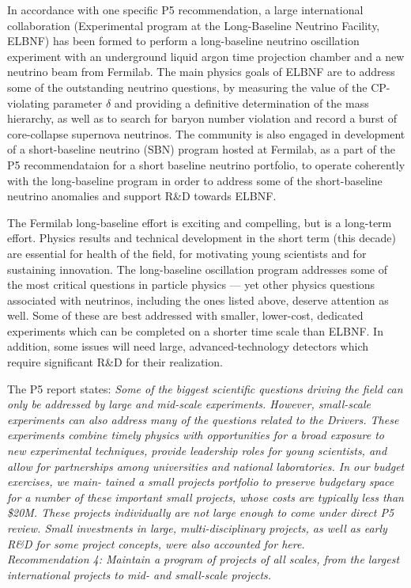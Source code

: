 In accordance with one specific P5 recommendation, a large international
collaboration (Experimental program at the Long-Baseline Neutrino
Facility, ELBNF) has been formed to perform a long-baseline neutrino
oscillation experiment with an underground liquid argon time
projection chamber and a new neutrino beam from
Fermilab. The main physics goals of ELBNF are to address some of the
outstanding neutrino questions, by measuring the value of
the CP-violating parameter $\delta$ and providing a definitive
determination of the mass hierarchy, as well as to search for baryon
number violation and record a burst of core-collapse supernova
neutrinos. The community is also engaged in development of a short-baseline
neutrino (SBN) program hosted at Fermilab, as a part of the P5
recommendataion for a short baseline neutrino portfolio, to operate
coherently with the long-baseline program in order to address some of
the short-baseline neutrino anomalies and support R\&D towards ELBNF.

The Fermilab long-baseline effort is exciting and compelling, but
is a long-term effort.  Physics results and technical development in
the short term (this decade) are essential for health of the field,
for motivating young scientists and for sustaining innovation.  The
long-baseline oscillation program addresses some of the most critical
questions in particle physics --- yet other physics questions
associated with neutrinos, including the ones listed above, deserve
attention as well.  Some of these are best addressed with smaller,
lower-cost, dedicated experiments which can be completed
on a shorter time scale than ELBNF.  In addition, some issues will
need large, advanced-technology detectors which require
significant R\&D for their realization.

The P5 report states:
\textit{Some of the biggest scientific questions driving the field can only be
addressed by large and mid-scale experiments. However, small-scale
experiments can also address many of the questions related to the
Drivers. These experiments combine timely physics with opportunities
for a broad exposure to new experimental techniques, provide
leadership roles for young scientists, and allow for partnerships
among universities and national laboratories. In our budget exercises,
we main- tained a small projects portfolio to preserve budgetary space
for a number of these important small projects, whose costs are
typically less than \$20M. These projects individually are not large
enough to come under direct P5 review. Small investments in large,
multi-disciplinary projects, as well as early R\&D for some project
concepts, were also accounted for here.}\\
\textit{{Recommendation 4: Maintain a program of projects of all
  scales, from the largest international projects to mid- and
  small-scale projects.}}


